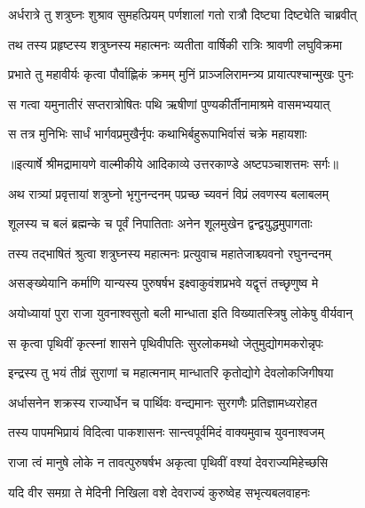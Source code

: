 \twolineshloka
{अर्धरात्रे तु शत्रुघ्नः शुश्राव सुमहत्प्रियम्}
{पर्णशालां गतो रात्रौ दिष्ट्या दिष्ट्येति चाब्रवीत्} %

\twolineshloka
{तथ तस्य प्रहृष्टस्य शत्रुघ्नस्य महात्मनः}
{व्यतीता वार्षिकी रात्रिः श्रावणी लघुविक्रमा} %

\twolineshloka
{प्रभाते तु महावीर्यः कृत्वा पौर्वाह्णिकं क्रमम्}
{मुनिं प्राञ्जलिरामन्त्र्य प्रायात्पश्चान्मुखः पुनः} %

\twolineshloka
{स गत्वा यमुनातीरं सप्तरात्रोषितः पथि}
{ऋषीणां पुण्यकीर्तीनामाश्रमे वासमभ्ययात्} %

\twolineshloka
{स तत्र मुनिभिः सार्धं भार्गवप्रमुखैर्नृपः}
{कथाभिर्बहुरूपाभिर्वासं चक्रे महायशाः} %


{॥इत्यार्षे श्रीमद्रामायणे वाल्मीकीये आदिकाव्ये उत्तरकाण्डे अष्टपञ्चाशत्तमः सर्गः॥}


\twolineshloka
{अथ रात्र्यां प्रवृत्तायां शत्रुघ्नो भृगुनन्दनम्}
{पप्रच्छ च्यवनं विप्रं लवणस्य बलाबलम्} %

\twolineshloka
{शूलस्य च बलं ब्रह्मन्के च पूर्वं निपातिताः}
{अनेन शूलमुखेन द्वन्द्वयुद्धमुपागताः} %

\twolineshloka
{तस्य तद्भाषितं श्रुत्वा शत्रुघ्नस्य महात्मनः}
{प्रत्युवाच महातेजाश्च्यवनो रघुनन्दनम्} %

\twolineshloka
{असङ्ख्येयानि कर्माणि यान्यस्य पुरुषर्षभ}
{इक्ष्वाकुवंशप्रभवे यद्वृत्तं तच्छृणुष्व मे} %

\twolineshloka
{अयोध्यायां पुरा राजा युवनाश्वसुतो बली}
{मान्धाता इति विख्यातस्त्रिषु लोकेषु वीर्यवान्} %

\twolineshloka
{स कृत्वा पृथिवीं कृत्स्नां शासने पृथिवीपतिः}
{सुरलोकमथो जेतुमुद्योगमकरोन्नृपः} %

\twolineshloka
{इन्द्रस्य तु भयं तीव्रं सुराणां च महात्मनाम्}
{मान्धातरि कृतोद्योगे देवलोकजिगीषया} %

\twolineshloka
{अर्धासनेन शक्रस्य राज्यार्धेन च पार्थिवः}
{वन्द्यमानः सुरगणैः प्रतिज्ञामध्यरोहत} %

\twolineshloka
{तस्य पापमभिप्रायं विदित्वा पाकशासनः}
{सान्त्वपूर्वमिदं वाक्यमुवाच युवनाश्वजम्} %

\twolineshloka
{राजा त्वं मानुषे लोके न तावत्पुरुषर्षभ}
{अकृत्वा पृथिवीं वश्यां देवराज्यमिहेच्छसि} %

\twolineshloka
{यदि वीर समग्रा ते मेदिनी निखिला वशे}
{देवराज्यं कुरुष्वेह सभृत्यबलवाहनः} %

